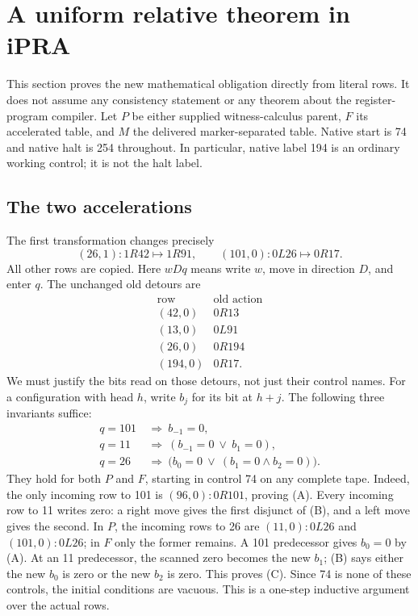 \section{A uniform relative theorem in iPRA}
\label{sec:relative}
This section proves the new mathematical obligation directly from literal
rows. It does not assume any consistency statement or any theorem about the
register-program compiler. Let $P$ be either supplied witness-calculus parent,
$F$ its accelerated table, and $M$ the delivered marker-separated table.
Native start is 74 and native halt is 254 throughout. In particular, native
label 194 is an ordinary working control; it is not the halt label.

\subsection{The two accelerations}
The first transformation changes precisely
\[
 (26,1):1R42\longmapsto1R91,
 \qquad (101,0):0L26\longmapsto0R17.
\]
All other rows are copied. Here $wDq$ means write $w$, move in direction
$D$, and enter $q$. The unchanged old detours are
\[
\begin{array}{c|c}
\text{row}&\text{old action}\\\hline
(42,0)&0R13\\
(13,0)&0L91\\
(26,0)&0R194\\
(194,0)&0R17.
\end{array}
\]
We must justify the bits read on those detours, not just their control names.
For a configuration with head $h$, write $b_j$ for its bit at $h+j$.
The following three invariants suffice:
\begin{align*}
 q=101&\ \Longrightarrow\ b_{-1}=0,\tag{A}\\
 q=11&\ \Longrightarrow\ (b_{-1}=0\ \lor\ b_1=0),\tag{B}\\
 q=26&\ \Longrightarrow\
       \bigl(b_0=0\ \lor\ (b_1=0\land b_2=0)\bigr).\tag{C}
\end{align*}
They hold for both $P$ and $F$, starting in control 74 on any complete tape.
Indeed, the only incoming row to 101 is $(96,0):0R101$, proving (A).
Every incoming row to 11 writes zero: a right move gives the first
disjunct of (B), and a left move gives the second.
In $P$, the incoming rows to 26 are $(11,0):0L26$ and
$(101,0):0L26$; in $F$ only the former remains.
A 101 predecessor gives $b_0=0$ by (A).
At an 11 predecessor, the scanned zero becomes the new $b_1$; (B)
says either the new $b_0$ is zero or the new $b_2$ is zero.
This proves (C). Since 74 is none of these controls, the initial conditions
are vacuous. This is a one-step inductive argument over the actual rows.


